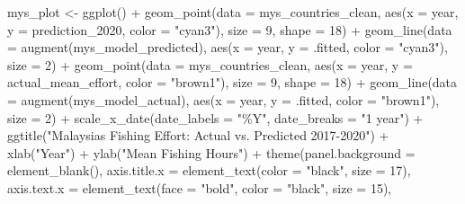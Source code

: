 \documentclass[
]{article}
\newenvironment{Shaded}{\begin{snugshade}}{\end{snugshade}}
\newcommand{\AttributeTok}[1]{\textcolor[rgb]{0.77,0.63,0.00}{#1}}
\newcommand{\DecValTok}[1]{\textcolor[rgb]{0.00,0.00,0.81}{#1}}
\newcommand{\FunctionTok}[1]{\textcolor[rgb]{0.00,0.00,0.00}{#1}}
\newcommand{\NormalTok}[1]{#1}
\newcommand{\OtherTok}[1]{\textcolor[rgb]{0.56,0.35,0.01}{#1}}
\newcommand{\SpecialCharTok}[1]{\textcolor[rgb]{0.00,0.00,0.00}{#1}}
\newcommand{\StringTok}[1]{\textcolor[rgb]{0.31,0.60,0.02}{#1}}
\begin{document}
\begin{Shaded}
\begin{Highlighting}[]
\NormalTok{mys\_plot }\OtherTok{\textless{}{-}} \FunctionTok{ggplot}\NormalTok{() }\SpecialCharTok{+}
   \FunctionTok{geom\_point}\NormalTok{(}\AttributeTok{data =}\NormalTok{ mys\_countries\_clean,}
              \FunctionTok{aes}\NormalTok{(}\AttributeTok{x =}\NormalTok{ year, }\AttributeTok{y =}\NormalTok{ prediction\_2020, }\AttributeTok{color =} \StringTok{"cyan3"}\NormalTok{),}
              \AttributeTok{size =} \DecValTok{9}\NormalTok{,}
              \AttributeTok{shape =} \DecValTok{18}\NormalTok{) }\SpecialCharTok{+}
   \FunctionTok{geom\_line}\NormalTok{(}\AttributeTok{data =} \FunctionTok{augment}\NormalTok{(mys\_model\_predicted),}
             \FunctionTok{aes}\NormalTok{(}\AttributeTok{x =}\NormalTok{ year, }\AttributeTok{y =}\NormalTok{ .fitted, }\AttributeTok{color =} \StringTok{"cyan3"}\NormalTok{),}
             \AttributeTok{size =} \DecValTok{2}\NormalTok{) }\SpecialCharTok{+}
  \FunctionTok{geom\_point}\NormalTok{(}\AttributeTok{data =}\NormalTok{ mys\_countries\_clean,}
              \FunctionTok{aes}\NormalTok{(}\AttributeTok{x =}\NormalTok{ year, }\AttributeTok{y =}\NormalTok{ actual\_mean\_effort, }\AttributeTok{color =} \StringTok{"brown1"}\NormalTok{),}
              \AttributeTok{size =} \DecValTok{9}\NormalTok{,}
              \AttributeTok{shape =} \DecValTok{18}\NormalTok{) }\SpecialCharTok{+}
   \FunctionTok{geom\_line}\NormalTok{(}\AttributeTok{data =} \FunctionTok{augment}\NormalTok{(mys\_model\_actual),}
             \FunctionTok{aes}\NormalTok{(}\AttributeTok{x =}\NormalTok{ year, }\AttributeTok{y =}\NormalTok{ .fitted, }\AttributeTok{color =} \StringTok{"brown1"}\NormalTok{),}
             \AttributeTok{size =} \DecValTok{2}\NormalTok{) }\SpecialCharTok{+} 
   \FunctionTok{scale\_x\_date}\NormalTok{(}\AttributeTok{date\_labels =} \StringTok{"\%Y"}\NormalTok{,}
                \AttributeTok{date\_breaks =} \StringTok{"1 year"}\NormalTok{) }\SpecialCharTok{+}
   \FunctionTok{ggtitle}\NormalTok{(}\StringTok{"Malaysia\textquotesingle{}s Fishing Effort: Actual vs. Predicted 2017{-}2020"}\NormalTok{) }\SpecialCharTok{+}
   \FunctionTok{xlab}\NormalTok{(}\StringTok{"Year"}\NormalTok{) }\SpecialCharTok{+} 
   \FunctionTok{ylab}\NormalTok{(}\StringTok{"Mean Fishing Hours"}\NormalTok{) }\SpecialCharTok{+}
   \FunctionTok{theme}\NormalTok{(}\AttributeTok{panel.background =} \FunctionTok{element\_blank}\NormalTok{(),}
         \AttributeTok{axis.title.x =} \FunctionTok{element\_text}\NormalTok{(}\AttributeTok{color =} \StringTok{"black"}\NormalTok{, }\AttributeTok{size =} \DecValTok{17}\NormalTok{),}
         \AttributeTok{axis.text.x =} \FunctionTok{element\_text}\NormalTok{(}\AttributeTok{face =} \StringTok{"bold"}\NormalTok{, }\AttributeTok{color =} \StringTok{"black"}\NormalTok{, }\AttributeTok{size =} \DecValTok{15}\NormalTok{),}

\end{Highlighting}
\end{Shaded}
\end{document}
